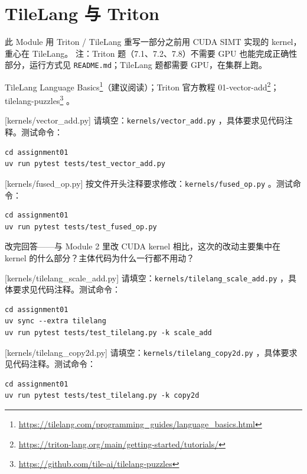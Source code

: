 \documentclass[11pt,a4paper,fontset=none]{ctexart}
\begin{document}
\section{TileLang 与 Triton}

此 Module 用 Triton / TileLang 重写一部分之前用 CUDA SIMT 实现的 kernel，重心在 TileLang。
注：Triton 题（7.1、7.2、7.8）不需要 GPU 也能完成正确性部分，运行方式见 \texttt{README.md}；TileLang 题都需要 GPU，在集群上跑。

\begin{reading}
TileLang Language Basics\footnote{\url{https://tilelang.com/programming_guides/language_basics.html}}（建议阅读）；Triton 官方教程 01-vector-add\footnote{\url{https://triton-lang.org/main/getting-started/tutorials/}}；tilelang-puzzles\footnote{\url{https://github.com/tile-ai/tilelang-puzzles}} 。
\end{reading}

[kernels/vector\_add.py]
请填空：\texttt{kernels/vector\_add.py} ，具体要求见代码注释。测试命令：

\begin{lstlisting}
cd assignment01
uv run pytest tests/test_vector_add.py
\end{lstlisting}

[kernels/fused\_op.py]
按文件开头注释要求修改：\texttt{kernels/fused\_op.py} 。测试命令：

\begin{lstlisting}
cd assignment01
uv run pytest tests/test_fused_op.py
\end{lstlisting}

改完回答——与 Module 2 里改 CUDA kernel 相比，这次的改动主要集中在 kernel 的什么部分？主体代码为什么一行都不用动？

[kernels/tilelang\_scale\_add.py]
请填空：\texttt{kernels/tilelang\_scale\_add.py} ，具体要求见代码注释。测试命令：

\begin{lstlisting}
cd assignment01
uv sync --extra tilelang
uv run pytest tests/test_tilelang.py -k scale_add
\end{lstlisting}

[kernels/tilelang\_copy2d.py]
请填空：\texttt{kernels/tilelang\_copy2d.py} ，具体要求见代码注释。测试命令：

\begin{lstlisting}
cd assignment01
uv run pytest tests/test_tilelang.py -k copy2d
\end{lstlisting}
\end{document}
